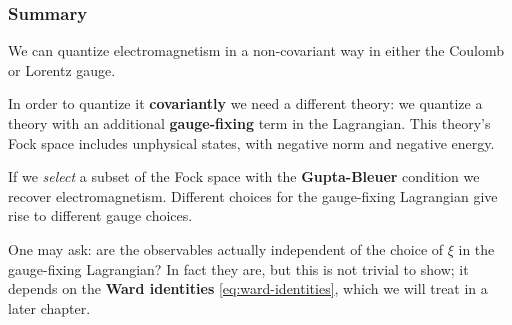 \documentclass[main.tex]{subfiles}
\begin{document}
\subsubsection{Summary}

We can quantize electromagnetism in a non-covariant way in either the Coulomb or Lorentz gauge. 

In order to quantize it \textbf{covariantly} we need a different theory: we quantize a theory with an additional \textbf{gauge-fixing} term in the Lagrangian. 
This theory's Fock space includes unphysical states, with negative norm and negative energy. 

If we \emph{select} a subset of the Fock space with the \textbf{Gupta-Bleuer} condition we recover electromagnetism. 
Different choices for the gauge-fixing Lagrangian give rise to different gauge choices. 

One may ask: are the observables actually independent of the choice of \(\xi \) in the gauge-fixing Lagrangian? In fact they are, but this is not trivial to show; it depends on the \textbf{Ward identities} \eqref{eq:ward-identities}, which we will treat in a later chapter.
\end{document}

